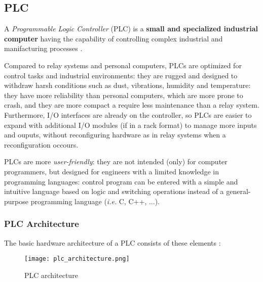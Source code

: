 \subsection{PLC}
\label{subsec:plc}
A \textit{Programmable Logic Controller} (PLC) is a \textbf{small and specialized industrial computer} having the capability of controlling complex industrial and manifacturing processes \cite{plc_definition}.

\bigskip
Compared to relay systems and personal computers, PLCs are optimized for control tasks and industrial environments: they are rugged and designed to withdraw harsh conditions such as dust, vibrations, humidity and temperature: they have more reliability than personal computers, which are more prone to crash, and they are more compact a require less maintenance than a relay system.
Furthermore, I/O interfaces are already on the controller, so PLCs are easier to expand with additional I/O modules (if in a rack format) to manage more inputs and ouputs, without reconfiguring hardware as in relay systems when a reconfiguration occours. 

\bigskip
PLCs are more \textit{user-friendly}: they are not intended (only) for computer programmers, but designed for engineers with a limited knowledge in programming languages: control program can be entered with a simple and intuitive language based on logic and switching operations instead of a general-purpose programming language (\textit{i.e.} C, C++, ...). 

\subsubsection{PLC Architecture}
The basic hardware architecture of a PLC consists of these elements \cite{plc_book}:

\begin{figure}[ht]
	\centering
	\texttt{[image: plc\_architecture.png]}
	\caption{PLC architecture}
	\label{fig:PLC_architecture}
\end{figure}


